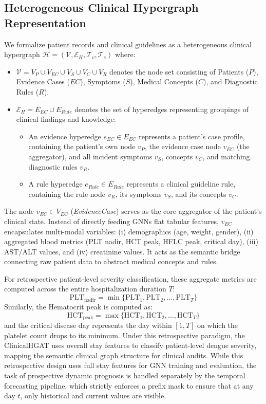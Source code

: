 \documentclass[conference]{IEEEtran}
\begin{document}
\subsection{Heterogeneous Clinical Hypergraph Representation}
We formalize patient records and clinical guidelines as a heterogeneous clinical hypergraph $\mathcal{H} = (\mathcal{V}, \mathcal{E}_H, \mathcal{T}_v, \mathcal{T}_e)$ where:
\begin{itemize}
    \item $\mathcal{V} = V_P \cup V_{EC} \cup V_S \cup V_C \cup V_R$ denotes the node set consisting of Patients ($P$), Evidence Cases ($EC$), Symptoms ($S$), Medical Concepts ($C$), and Diagnostic Rules ($R$).
    \item $\mathcal{E}_H = E_{EC} \cup E_{Rule}$ denotes the set of hyperedges representing groupings of clinical findings and knowledge:
    \begin{itemize}
        \item An evidence hyperedge $e_{EC} \in E_{EC}$ represents a patient's case profile, containing the patient's own node $v_P$, the evidence case node $v_{EC}$ (the aggregator), and all incident symptoms $v_S$, concepts $v_C$, and matching diagnostic rules $v_R$.
        \item A rule hyperedge $e_{Rule} \in E_{Rule}$ represents a clinical guideline rule, containing the rule node $v_R$, its symptoms $v_S$, and its concepts $v_C$.
    \end{itemize}
\end{itemize}
The node $v_{EC} \in V_{EC}$ (\textit{EvidenceCase}) serves as the core aggregator of the patient's clinical state. Instead of directly feeding GNNs flat tabular features, $v_{EC}$ encapsulates multi-modal variables: (i) demographics (age, weight, gender), (ii) aggregated blood metrics (PLT nadir, HCT peak, HFLC peak, critical day), (iii) AST/ALT values, and (iv) creatinine values. It acts as the semantic bridge connecting raw patient data to abstract medical concepts and rules.

For retrospective patient-level severity classification, these aggregate metrics are computed across the entire hospitalization duration $T$:
\begin{equation}
    \text{PLT}_{\text{nadir}} = \min \{ \text{PLT}_1, \text{PLT}_2, \dots, \text{PLT}_T \}
\end{equation}
Similarly, the Hematocrit peak is computed as:
\begin{equation}
    \text{HCT}_{\text{peak}} = \max \{ \text{HCT}_1, \text{HCT}_2, \dots, \text{HCT}_T \}
\end{equation}
and the critical disease day represents the day within $[1, T]$ on which the platelet count drops to its minimum. Under this retrospective paradigm, the ClinicalHGAT uses overall stay features to classify patient-level dengue severity, mapping the semantic clinical graph structure for clinical audits. While this retrospective design uses full stay features for GNN training and evaluation, the task of prospective dynamic prognosis is handled separately by the temporal forecasting pipeline, which strictly enforces a prefix mask to ensure that at any day $t$, only historical and current values are visible.
\end{document}
